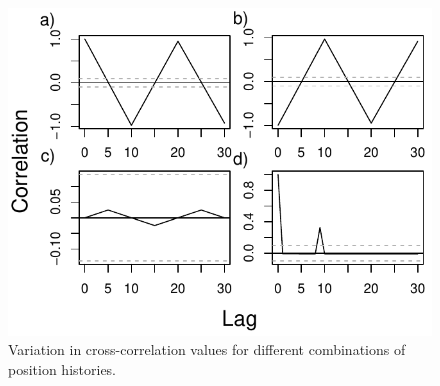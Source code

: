\documentclass[letterpaper]{article}
\begin{document}


\clearpage

\begin{figure}
    \includegraphics[width=\textwidth]{figures/example_xcorrs.pdf}
    \caption{Variation in cross-correlation values for different combinations of position histories. }
    \label{fig:xcorrs}
\end{figure}
\end{document}
